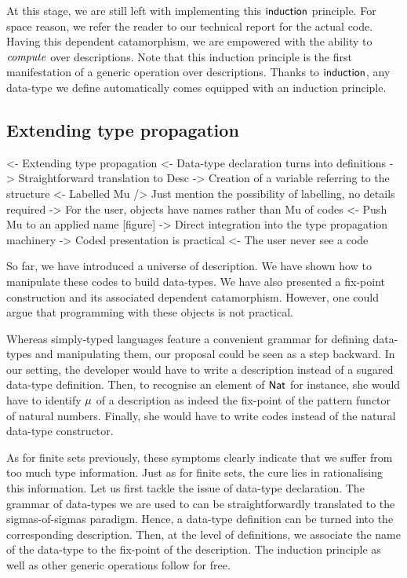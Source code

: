 At this stage, we are still left with implementing this
$\F{induction}$ principle. For space reason, we refer the reader to
our technical report for the actual code. Having this dependent
catamorphism, we are empowered with the ability to $\emph{compute}$
over descriptions. Note that this induction principle is the first
manifestation of a generic operation over descriptions. Thanks to
$\F{induction}$, any data-type we define automatically comes equipped
with an induction principle.


\subsection{Extending type propagation}

\begin{wstructure}
<- Extending type propagation
    <- Data-type declaration turns into definitions
        -> Straightforward translation to Desc
        -> Creation of a variable referring to the structure
    <- Labelled Mu
        /> Just mention the possibility of labelling, no details required
        -> For the user, objects have names rather than Mu of codes
    <- Push Mu to an applied name [figure]
        -> Direct integration into the type propagation machinery
    -> Coded presentation is practical
        <- The user never see a code
\end{wstructure}


So far, we have introduced a universe of description. We have shown
how to manipulate these codes to build data-types. We have also
presented a fix-point construction and its associated dependent
catamorphism. However, one could argue that programming with these
objects is not practical.

Whereas simply-typed languages feature a convenient grammar for
defining data-types and manipulating them, our proposal could be seen
as a step backward. In our setting, the developer would have to write
a description instead of a sugared data-type definition. Then, to
recognise an element of $\Nat$ for instance, she would have to
identify $\Mu{}$ of a description as indeed the fix-point of the
pattern functor of natural numbers. Finally, she would have to write
codes instead of the natural data-type constructor.

As for finite sets previously, these symptoms clearly indicate that we
suffer from too much type information. Just as for finite sets, the
cure lies in rationalising this information. Let us first tackle the
issue of data-type declaration. The grammar of data-types we are used
to can be straightforwardly translated to the sigmas-of-sigmas
paradigm. Hence, a data-type definition can be turned into the
corresponding description. Then, at the level of definitions, we
associate the name of the data-type to the fix-point of the
description. The induction principle as well as other generic
operations follow for free.

